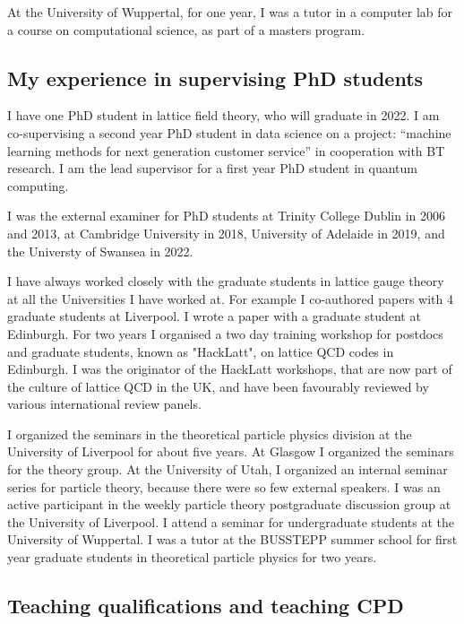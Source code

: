 \documentclass[12pt]{article}
\begin{document}
At the University of Wuppertal, for one year, I was a tutor in
a computer lab for a course on computational 
science, as part of a masters program.


\subsection{My experience in supervising PhD students}

I have one PhD student in lattice field theory, who will graduate in
2022. I am co-supervising a second year PhD student in data science on
a project: ``machine learning methods for next generation customer
service'' in cooperation with BT research. I am the lead supervisor
for a first year PhD student in quantum computing.


I was the external examiner for PhD students
at Trinity College Dublin in 2006 and 2013,
at Cambridge University in 2018,
University of Adelaide in 2019, 
and the Universty of Swansea in 2022.


I have always worked closely with the graduate students in lattice
gauge theory at all the Universities I have worked at.  For example I
co-authored papers with 4 graduate students at Liverpool. I wrote a
paper with a graduate student at Edinburgh.  For two years I organised
a two day training workshop for postdocs and graduate students, known
as "HackLatt", on lattice QCD codes in Edinburgh. I was the originator
of the HackLatt workshops, that are now part of the culture of lattice
QCD in the UK, and have been favourably reviewed by various
international review panels.



I organized the seminars in the theoretical particle physics division
at the University of Liverpool for about five years. At Glasgow I
organized the seminars for the theory group.  At the University of
Utah, I organized an internal seminar series for particle theory,
because there were so few external speakers.
I was an active
participant in the weekly particle theory postgraduate discussion
group at the University of Liverpool.
I attend a seminar for undergraduate students at the University
of Wuppertal.
I was a tutor at the BUSSTEPP summer school for first year
graduate students in theoretical particle physics for two years.



\subsection{Teaching qualifications and teaching CPD}
\end{document}
